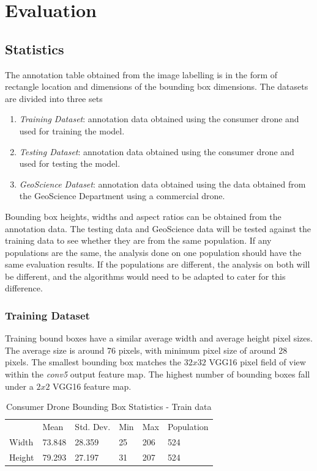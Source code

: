 \documentclass{IEEEtran}
\begin{document}
\onecolumn


\section{Evaluation}

\subsection{Statistics}

The annotation table obtained from the image labelling is in the form of rectangle location and dimensions of the bounding box dimensions. The datasets are divided into three sets
\begin{enumerate}
\item \textit{Training Dataset}: annotation data obtained using the consumer drone and used for training the model.
\item \textit{Testing Dataset}: annotation data obtained using the consumer drone and used for testing the model.
\item \textit{GeoScience Dataset}: annotation data obtained using the data obtained from the GeoScience Department using a commercial drone.
\end{enumerate}

Bounding box heights, widths and aspect ratios can be obtained from the annotation data. The testing data and GeoScience data will be tested against the training data to see whether they are from the same population. If any populations are the same, the analysis done on one population should have the same evaluation results. If the populations are different, the analysis on both will be different, and the algorithms would need to be adapted to cater for this difference.

\subsubsection{Training Dataset}

Training bound boxes have a similar average width and average height pixel sizes. The average size is around 76 pixels, with minimum pixel size of around 28 pixels. The smallest bounding box matches the $32x32$ VGG16 pixel field of view within the \textit{conv5} output feature map. The highest number of bounding boxes fall under a $2x2$ VGG16 feature map.

\begin{table}[ht]
\caption{Consumer Drone Bounding Box Statistics - Train data}
\centering
\begin{tabular}{llllll}
       & Mean   & Std. Dev. & Min & Max & Population \\
Width  & 73.848 & 28.359 & 25 & 206  & 524 \\
Height & 79.293 & 27.197 & 31 & 207  & 524
\end{tabular}
\end{table}
\end{document}
